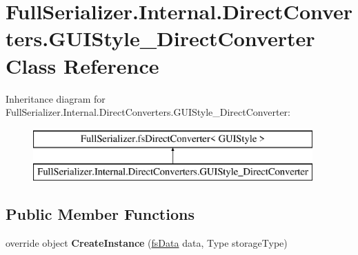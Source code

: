 \hypertarget{class_full_serializer_1_1_internal_1_1_direct_converters_1_1_g_u_i_style___direct_converter}{}\section{Full\+Serializer.\+Internal.\+Direct\+Converters.\+G\+U\+I\+Style\+\_\+\+Direct\+Converter Class Reference}
\label{class_full_serializer_1_1_internal_1_1_direct_converters_1_1_g_u_i_style___direct_converter}
Inheritance diagram for Full\+Serializer.\+Internal.\+Direct\+Converters.\+G\+U\+I\+Style\+\_\+\+Direct\+Converter\+:\begin{figure}[H]
\begin{center}
\leavevmode
\includegraphics[height=2.000000cm]{class_full_serializer_1_1_internal_1_1_direct_converters_1_1_g_u_i_style___direct_converter}
\end{center}
\end{figure}
\subsection*{Public Member Functions}
\begin{DoxyCompactItemize}
\item 
\mbox{\label{class_full_serializer_1_1_internal_1_1_direct_converters_1_1_g_u_i_style___direct_converter_a6e9709e22125ee8f1f11449524257748}} 
override object {\bfseries Create\+Instance} (\hyperlink{class_full_serializer_1_1fs_data}{fs\+Data} data, Type storage\+Type)
\end{DoxyCompactItemize}
